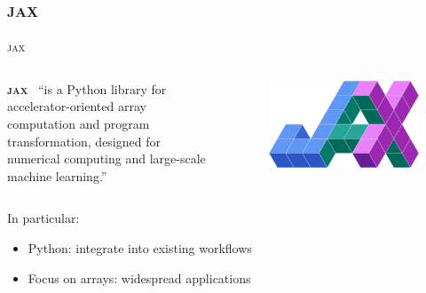 \documentclass[usenames,dvipsnames,t]{beamer}
\newcommand{\ghlink}[1]{\href{https://github.com/#1}{\textcolor{black}{\faGithub}}}
\begin{document}
\subsection{\textsc{jax}}


\begin{frame}{\textsc{jax}}

  \def\x{5mm}
  \def\y{1mm}

  \begin{columns}
    \begin{column}{0.84\linewidth}
      \textbf{\textsc{jax}}~\ghlink{jax-ml/jax}
      ``is a Python library for accelerator-oriented array computation and program transformation, designed for  numerical computing and large-scale machine learning.''~\cite{jax2018github}
    \end{column}
    \begin{column}{0.15\linewidth}
      \begin{figure}
        \centering
        \includegraphics[width=0.95\linewidth]{Figures/jax.png}
      \end{figure}
    \end{column}
  \end{columns}

  \vspace{\x}
  \pause

  In particular:
  \begin{itemize}
    \vspace{\y}
    \item Python: integrate into existing workflows

    \vspace{\y}

    \item Focus on arrays: widespread applications
    
    \vspace{\y}


\end{itemize}
\end{frame}
\end{document}
